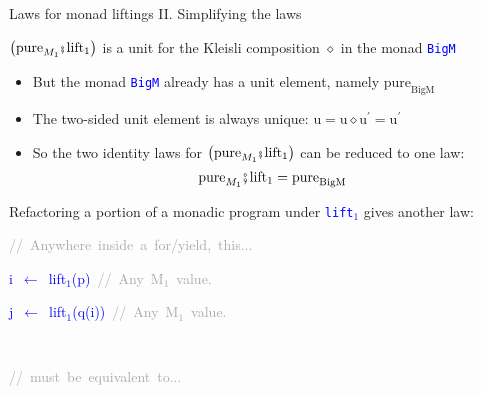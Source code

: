 \documentclass[english]{beamer}
\newenvironment{lyxcode}
  {\par\begin{list}{}{
    \setlength{\rightmargin}{\leftmargin}
    \setlength{\listparindent}{0pt}%
    \raggedright
    \setlength{\itemsep}{0pt}
    \setlength{\parsep}{0pt}
    \normalfont\ttfamily}%
   \def\{{\char`\{}
   \def\}{\char`\}}
   \def\textasciitilde{\char`\~}
   \item[]}
  {\end{list}}
\newcommand{\bef}{\hspace{0.5pt}\ensuremath\mathsmaller{\fatsemi}\hspace{1.5pt}}
\begin{document}
\begin{frame}{Laws for monad liftings II. Simplifying the laws}

{\footnotesize{}\vspace{-0.2cm}\hspace{-0.0cm}}$\big(\text{pure}_{M_{1}}\bef\text{lift}_{1}\big)$
is a unit for the Kleisli composition $\diamond$ in the monad \texttt{\textcolor{blue}{\footnotesize{}BigM}} 
\begin{itemize}
\item But the monad \texttt{\textcolor{blue}{\footnotesize{}BigM}} already
has a unit element, namely $\text{pure}_{\text{BigM}}$
\item The two-sided unit element is always unique: $\text{u}=\text{u}\diamond\text{u}^{\prime}=\text{u}^{\prime}$
\item So the two identity laws for $\big(\text{pure}_{M_{1}}\bef\text{lift}_{1}\big)$
can be reduced to one law:{\footnotesize{}\vspace{-0.1cm}\hspace{-0.0cm}
\[
\text{pure}_{M_{1}}\bef\text{lift}_{1}=\text{pure}_{\text{BigM}}
\]
}{\footnotesize\par}
\end{itemize}
{\footnotesize{}\vspace{-0.15cm}\hspace{-0.0cm}}Refactoring a portion
of a monadic program under \texttt{\textcolor{blue}{\footnotesize{}lift$_{1}$}}
gives another law:

{\footnotesize{}\vspace{-0.2cm}\hspace{-0.0cm}}\texttt{\textcolor{blue}{\footnotesize{}}}%
\begin{minipage}[t]{0.58\columnwidth}%
\begin{lyxcode}
\textrm{\textcolor{darkgray}{\footnotesize{}//~Anywhere~inside~a~for/yield,~this...}}{\footnotesize\par}

\textcolor{blue}{\footnotesize{}i~$\leftarrow$~lift$_{1}$(p)~}\textrm{\textcolor{darkgray}{\footnotesize{}//~Any~M$_{1}$~value.}}{\footnotesize\par}

\textcolor{blue}{\footnotesize{}j~$\leftarrow$~lift$_{1}$(q(i))~}\textrm{\textcolor{darkgray}{\footnotesize{}//~Any~M$_{1}$~value.}}{\footnotesize\par}
\end{lyxcode}
%
\end{minipage}\texttt{\textcolor{blue}{\footnotesize{}~ }}%
\begin{minipage}[t]{0.5\columnwidth}%
\begin{lyxcode}
\textrm{\textcolor{darkgray}{\footnotesize{}//~must~be~equivalent~to...}}{\footnotesize\par}


\end{lyxcode}
\end{minipage}
\end{frame}
\end{document}

